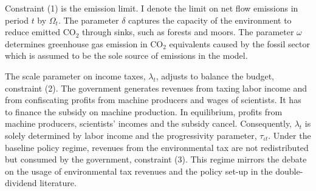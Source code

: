 Constraint (1) is the emission limit. I denote the limit on net flow emissions in period $t$ by $\Omega_t$.  The parameter $\delta$ captures the capacity of the environment to reduce emitted CO$_2$ through sinks, such as forests and moors.  The parameter $\omega$ determines greenhouse gas emission in CO$_2$ equivalents caused by the fossil sector which is assumed to be the sole source of emissions in the model. %

The scale parameter on income taxes, $\lambda_t$, adjusts to balance the budget, constraint (2).
The government generates revenues from taxing labor income and from confiscating profits from machine producers and wages of scientists. It has to finance the subsidy on machine production. In equilibrium, profits from machine producers, scientists' incomes and the subsidy cancel. Consequently, $\lambda_t$ is solely determined by labor income and the progressivity parameter, $\tau_{\iota t}$.
Under the baseline policy regime, revenues from the environmental tax are not redistributed but consumed by the government,  constraint (3). This regime mirrors the debate on the usage of environmental tax revenues and the policy set-up in the double-dividend literature. 

